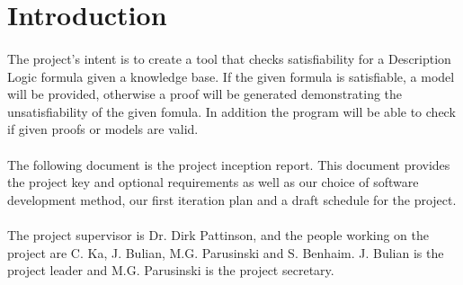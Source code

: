 \documentclass[12pt]{article}
\begin{document}
\section*{Introduction}

\paragraph{} The project's intent is to create a tool that checks satisfiability for a Description Logic formula given a knowledge base. If the given formula is satisfiable, a model will be provided, otherwise a proof will be generated demonstrating the unsatisfiability of the given fomula. In addition the program will be able to check if given proofs or models are valid.

\paragraph{} The following document is the project inception report. This document provides the project key and optional requirements as well as our choice of software development method, our first iteration plan and a draft schedule for the project.

\paragraph{} The project supervisor is Dr. Dirk Pattinson, and the people working on the project
are C. Ka, J. Bulian, M.G. Parusinski and S. Benhaim. J. Bulian is the project leader and M.G. Parusinski is the project secretary.

\pagebreak
\end{document}
